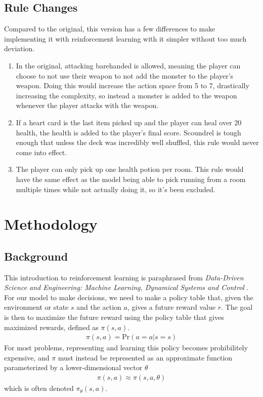 \documentclass{article}
\begin{document}
\subsection{Rule Changes}
Compared to the original, this version has a few differences to make implementing it with reinforcement learning with it simpler without too much deviation.
\begin{enumerate}
  \item In the original, attacking barehanded is allowed, meaning the player can choose to not use their weapon to not add the monster to the player's weapon. Doing this would increase the action space from 5 to 7, drastically increasing the complexity, so instead a monster is added to the weapon whenever the player attacks with the weapon.
  \item If a heart card is the last item picked up and the player can heal over 20 health, the health is added to the player's final score. Scoundrel is tough enough that unless the deck was incredibly well shuffled, this rule would never come into effect.
  \item The player can only pick up one health potion per room. This rule would have the same effect as the model being able to pick running from a room multiple times while not actually doing it, so it's been excluded.
\end{enumerate}

\section{Methodology}

\subsection{Background}
This introduction to reinforcement learning is paraphrased from \textit{Data-Driven Science and Engineering: Machine Learning, Dynamical Systems and Control} \cite{brunton_data-driven_2019}.
For our model to make decisions, we need to make a policy table that, given the environment or state $s$ and the action $a$, gives a future reward value $r$. The goal is then to maximize the future reward using the policy table that gives maximized rewards, defined as $\pi(s, a)$.
\begin{align*}
  \pi(s, a) = \text{Pr}(a=a | s=s)
\end{align*}
For most problems, representing and learning this policy becomes prohibilitely expensive, and $\pi$ must instead be represented as an approximate function parameterized by a lower-dimensional vector $\theta$
\begin{align*}
  \pi(s, a) \approx \pi(s, a, \theta)
\end{align*}
which is often denoted $\pi_\theta(s, a)$.
\end{document}
